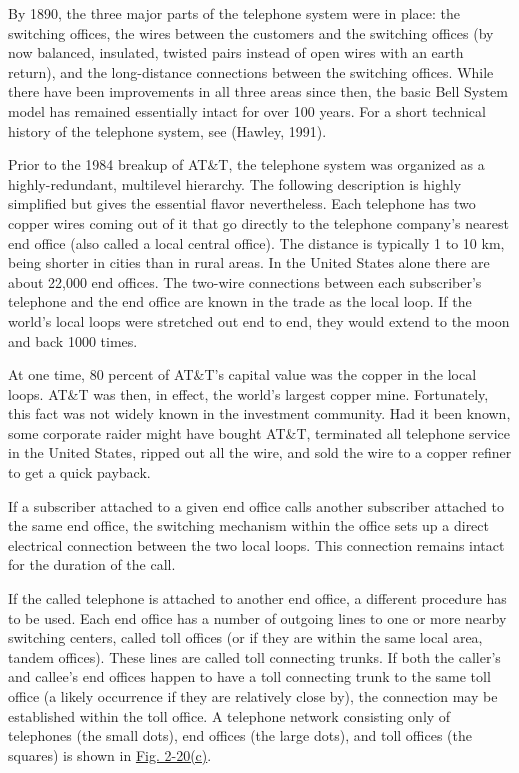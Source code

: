 \documentclass[b5paper,11pt]{memoir}
\begin{document}
By 1890, the three major parts of the telephone system were in place:
the switching offices, the wires between the customers and the switching
offices (by now balanced, insulated, twisted pairs instead of open wires
with an earth return), and the long-distance connections between the
switching offices. While there have been improvements in all three areas
since then, the basic Bell System model has remained essentially intact
for over 100 years. For a short technical history of the telephone
system, see (Hawley, 1991).

Prior to the 1984 breakup of AT\&T, the telephone system was organized
as a highly-redundant, multilevel hierarchy. The following description
is highly simplified but gives the essential flavor nevertheless. Each
telephone has two copper wires coming out of it that go directly to the
telephone company's nearest {end office} (also called a {local central
office}). The distance is typically 1 to 10 km, being shorter in cities
than in rural areas. In the United States alone there are about 22,000
end offices. The two-wire connections between each subscriber's
telephone and the end office are known in the trade as the {local loop}.
If the world's local loops were stretched out end to end, they would
extend to the moon and back 1000 times.

At one time, 80 percent of AT\&T's capital value was the copper in the
local loops. AT\&T was then, in effect, the world's largest copper mine.
Fortunately, this fact was not widely known in the investment community.
Had it been known, some corporate raider might have bought AT\&T,
terminated all telephone service in the United States, ripped out all
the wire, and sold the wire to a copper refiner to get a quick payback.

If a subscriber attached to a given end office calls another subscriber
attached to the same end office, the switching mechanism within the
office sets up a direct electrical connection between the two local
loops. This connection remains intact for the duration of the call.

If the called telephone is attached to another end office, a different
procedure has to be used. Each end office has a number of outgoing lines
to one or more nearby switching centers, called {toll offices} (or if
they are within the same local area, {tandem offices}). These lines are
called {toll connecting trunks}. If both the caller's and callee's end
offices happen to have a toll connecting trunk to the same toll office
(a likely occurrence if they are relatively close by), the connection
may be established within the toll office. A telephone network
consisting only of telephones (the small dots), end offices (the large
dots), and toll offices (the squares) is shown in
\protect\hyperlink{0130661023_ch02lev1sec5.htmlux5cux23ch02fig20}{Fig.
2-20(c)}.
\end{document}
